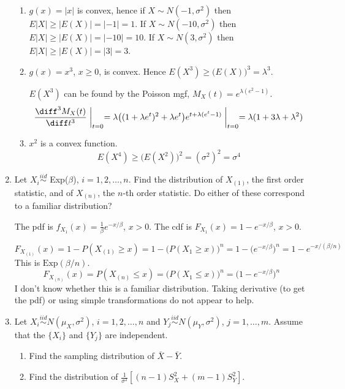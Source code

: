 \documentclass[12pt]{article}
\begin{document}
\begin{enumerate}
\hrulefill

  \begin{enumerate}
  \item
    $g(x) = |x|$ is convex, hence
    if $X \sim N(-1,\sigma^2)$ then
    $E|X| \ge |E(X)| = |-1| = 1$.
    If $X \sim N(-10,\sigma^2)$ then
    $E|X| \ge |E(X)| = |-10| = 10$.
    If $X \sim N(3,\sigma^2)$ then
    $E|X| \ge |E(X)| = |3| = 3$.

    \item
    $g(x) = x^3$, $x\ge 0$, is convex.
    Hence
    $E(X^3) \ge \bigl(E(X)\bigr)^3 = \lambda^3$.

    $E(X^3)$ can be found by the Poisson mgf,
    $M_X(t) = e^{\lambda(e^2-1)}$.
    \[
    \frac{\diff^3 M_X(t)}{\diff t^3} \biggm|_{t=0}
    = \lambda \bigl((1 + \lambda e^t)^2 + \lambda e^t\bigr)
        e^{t + \lambda(e^t -1)} \biggm|_{t=0}
    = \lambda(1 + 3\lambda + \lambda^2)
    \]

    \item
    $x^2$ is a convex function.
    \[
    E(X^4) \ge \bigl(E(X^2)\bigr)^2 = (\sigma^2)^2 = \sigma^4
    \]
  \end{enumerate}

\item Let $X_i \stackrel{iid}{\sim} $ Exp($\beta$), $i=1,2,\ldots,n$.
Find the distribution of $X_{(1)}$, the first order statistic, and
of $X_{(n)}$, the $n$-th order statistic.  Do either of these correspond to a familiar distribution?

\hrulefill

The pdf is $f_{X_1}(x) = \frac{1}{\beta} e^{-x/\beta}$, $x > 0$.
The cdf is $F_{X_1}(x) = 1 - e^{-x/\beta}$, $x > 0$.

\[
F_{X_{(1)}}(x)
= 1 - P(X_{(1)} \ge x)
= 1 - \bigl(P(X_1 \ge x)\bigr)^n
= 1 - \bigl(e^{-x/\beta}\bigr)^n
= 1 - e^{-x/(\beta/n)}
\]
This is $\text{Exp}(\beta/n)$.
\[
F_{X_{(n)}}(x)
= P(X_{(n)} \le x)
= \bigl(P(X_1 \le x)\bigr)^n
= \bigl(1 - e^{-x/\beta}\bigr)^n
\]
I don't know whether this is a familiar distribution.
Taking derivative (to get the pdf) or using simple transformations do
not appear to help.

\item
Let $X_i \stackrel{iid}{\sim} N(\mu_X,\sigma^2)$, $i=1,2,\ldots,n$ and
$Y_j \stackrel{iid}{\sim} N(\mu_Y,\sigma^2)$, $j = 1,\ldots,m$.
Assume that the $\{X_i\}$ and $\{Y_j\}$ are independent.
     \begin{enumerate}
     \item Find the sampling distribution of $\bar{X}-\bar{Y}$.
     \item Find the distribution of $\frac{1}{\sigma^2}[(n-1)S_X^2 + (m-1)S_Y^2]$.
     \end{enumerate}


\end{enumerate}
\end{document}
